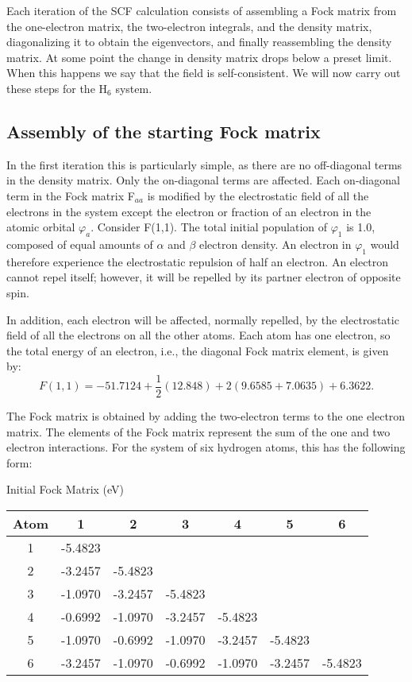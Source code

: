 Each iteration of the SCF calculation consists of assembling a Fock matrix from
the one-electron matrix, the two-electron integrals, and the density matrix,
diagonalizing it to obtain the eigenvectors, and finally reassembling the
density matrix. At some point the change in density matrix drops below a preset
limit. When this happens we say that the field is self-consistent. We will now
carry out these steps for the H$_6$ system.

\subsection{Assembly of the starting Fock matrix}
In the first iteration this is particularly simple, as there are no
off-diagonal terms in the density matrix. Only the on-diagonal terms are
affected. Each on-diagonal term in the Fock matrix F$_{aa}$ is modified by the
electrostatic field of all the electrons in the system except the electron or
fraction of an electron in the atomic orbital $\varphi_a$. Consider F(1,1). The
total initial population of $\varphi_1$ is 1.0, composed of equal amounts of
$\alpha$ and $\beta$ electron density. An electron in $\varphi_1$ would
therefore experience the electrostatic repulsion of half an electron. An
electron cannot repel itself; however, it will be repelled by its partner
electron of opposite spin.

In addition, each electron will be affected, normally repelled, by the
electrostatic field of all the electrons on all the other atoms. Each atom has
one electron, so the total energy of an electron, i.e., the diagonal Fock
matrix element, is given by:
$$
 F(1,1) = -51.7124 + \frac{1}{2}(12.848) + 2(9.6585 + 7.0635) + 6.3622.
$$

The Fock matrix is obtained by adding the two-electron
terms to the one electron matrix. The elements of the Fock
matrix represent the sum of the one and two electron
interactions. For the system of six hydrogen atoms, this
has the following form:
\begin{center}
Initial Fock Matrix (eV) \nopagebreak \\
\begin{tabular}{ccccccc} \hline
 Atom &   1    &  2   &   3    &  4    &  5  &    6 \\ \hline
 1& -5.4823  \\
 2& -3.2457& -5.4823  \\
 3& -1.0970& -3.2457& -5.4823  \\
 4& -0.6992& -1.0970& -3.2457& -5.4823  \\
 5& -1.0970& -0.6992& -1.0970& -3.2457& -5.4823  \\
 6& -3.2457& -1.0970& -0.6992& -1.0970& -3.2457& -5.4823  \\ \hline
\end{tabular}
\end{center}

